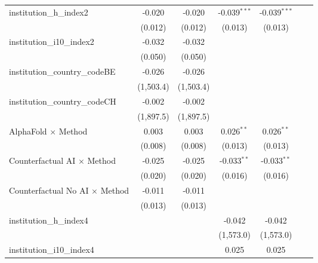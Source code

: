 \begin{tabular}{lcccccc}
   institution\_h\_index2                & -0.020       & -0.020       & -0.039$^{***}$ & -0.039$^{***}$ &     &   \\   
                                         & (0.012)      & (0.012)      & (0.013)        & (0.013)        &     &   \\   
   institution\_i10\_index2              & -0.032       & -0.032       &                &                &     &   \\   
                                         & (0.050)      & (0.050)      &                &                &     &   \\   
   institution\_country\_codeBE          & -0.026       & -0.026       &                &                &     &   \\   
                                         & (1,503.4)    & (1,503.4)    &                &                &     &   \\   
   institution\_country\_codeCH          & -0.002       & -0.002       &                &                &     &   \\   
                                         & (1,897.5)    & (1,897.5)    &                &                &     &   \\   
   AlphaFold $\times$ Method             & 0.003        & 0.003        & 0.026$^{**}$   & 0.026$^{**}$   &     &   \\   
                                         & (0.008)      & (0.008)      & (0.013)        & (0.013)        &     &   \\   
   Counterfactual AI $\times$ Method     & -0.025       & -0.025       & -0.033$^{**}$  & -0.033$^{**}$  &     &   \\   
                                         & (0.020)      & (0.020)      & (0.016)        & (0.016)        &     &   \\   
   Counterfactual No AI $\times$ Method  & -0.011       & -0.011       &                &                &     &   \\   
                                         & (0.013)      & (0.013)      &                &                &     &   \\   
   institution\_h\_index4                &              &              & -0.042         & -0.042         &     &   \\   
                                         &              &              & (1,573.0)      & (1,573.0)      &     &   \\   
   institution\_i10\_index4              &              &              & 0.025          & 0.025          &     &   \\   

\end{tabular}
